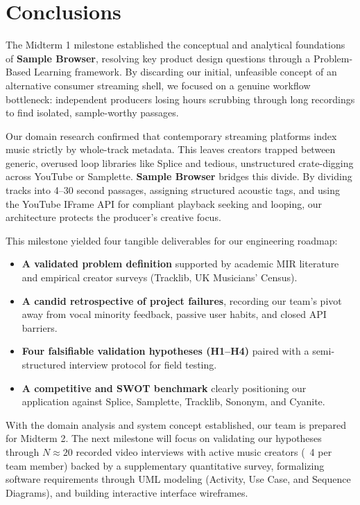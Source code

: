 \chapter{Conclusions}

The Midterm 1 milestone established the conceptual and analytical foundations of \textbf{Sample Browser}, resolving key product design questions through a Problem-Based Learning framework. By discarding our initial, unfeasible concept of an alternative consumer streaming shell, we focused on a genuine workflow bottleneck: independent producers losing hours scrubbing through long recordings to find isolated, sample-worthy passages.

Our domain research confirmed that contemporary streaming platforms index music strictly by whole-track metadata. This leaves creators trapped between generic, overused loop libraries like Splice and tedious, unstructured crate-digging across YouTube or Samplette. \textbf{Sample Browser} bridges this divide. By dividing tracks into 4--30 second passages, assigning structured acoustic tags, and using the YouTube IFrame API for compliant playback seeking and looping, our architecture protects the producer's creative focus.

This milestone yielded four tangible deliverables for our engineering roadmap:
\begin{itemize}
    \item \textbf{A validated problem definition} supported by academic MIR literature and empirical creator surveys (Tracklib, UK Musicians' Census).
    \item \textbf{A candid retrospective of project failures}, recording our team's pivot away from vocal minority feedback, passive user habits, and closed API barriers.
    \item \textbf{Four falsifiable validation hypotheses (H1--H4)} paired with a semi-structured interview protocol for field testing.
    \item \textbf{A competitive and SWOT benchmark} clearly positioning our application against Splice, Samplette, Tracklib, Sononym, and Cyanite.
\end{itemize}

With the domain analysis and system concept established, our team is prepared for Midterm 2. The next milestone will focus on validating our hypotheses through $N \approx 20$ recorded video interviews with active music creators (~4 per team member) backed by a supplementary quantitative survey, formalizing software requirements through UML modeling (Activity, Use Case, and Sequence Diagrams), and building interactive interface wireframes.
